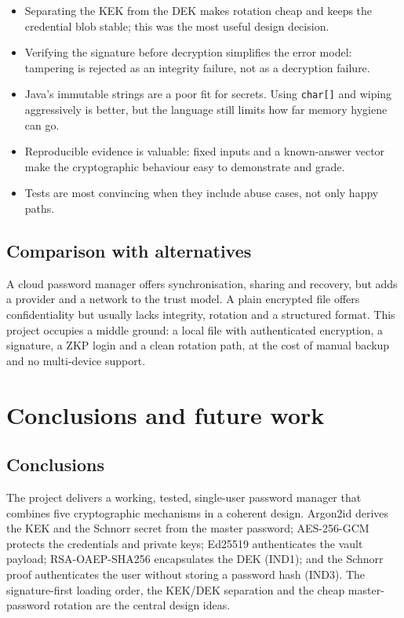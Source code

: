 \documentclass[11pt,a4paper]{article}
\newcommand{\code}[1]{\texttt{#1}}
\begin{document}
\begin{itemize}[leftmargin=*]
  \item Separating the KEK from the DEK makes rotation cheap and keeps the
        credential blob stable; this was the most useful design decision.
  \item Verifying the signature before decryption simplifies the error model:
        tampering is rejected as an integrity failure, not as a decryption
        failure.
  \item Java's immutable strings are a poor fit for secrets. Using
        \code{char[]} and wiping aggressively is better, but the language still
        limits how far memory hygiene can go.
  \item Reproducible evidence is valuable: fixed inputs and a known-answer
        vector make the cryptographic behaviour easy to demonstrate and grade.
  \item Tests are most convincing when they include abuse cases, not only happy
        paths.
\end{itemize}

\subsection{Comparison with alternatives}

A cloud password manager offers synchronisation, sharing and recovery, but adds
a provider and a network to the trust model. A plain encrypted file offers
confidentiality but usually lacks integrity, rotation and a structured format.
This project occupies a middle ground: a local file with authenticated
encryption, a signature, a ZKP login and a clean rotation path, at the cost of
manual backup and no multi-device support.

\section{Conclusions and future work}\label{sec:conclusions}

\subsection{Conclusions}

The project delivers a working, tested, single-user password manager that
combines five cryptographic mechanisms in a coherent design. Argon2id derives
the KEK and the Schnorr secret from the master password; AES-256-GCM protects
the credentials and private keys; Ed25519 authenticates the vault payload;
RSA-OAEP-SHA256 encapsulates the DEK (IND1); and the Schnorr proof authenticates
the user without storing a password hash (IND3). The signature-first loading
order, the KEK/DEK separation and the cheap master-password rotation are the
central design ideas.
\end{document}
